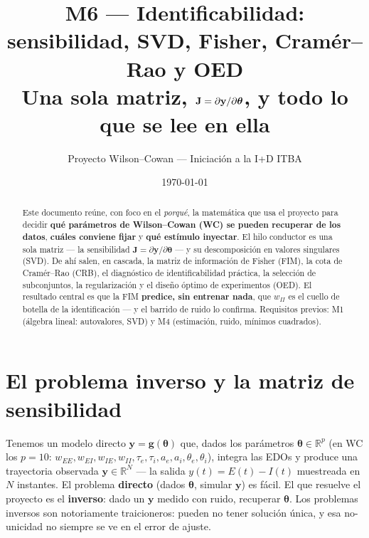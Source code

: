 \documentclass[11pt,a4paper]{article}
\title{\textbf{M6 --- Identificabilidad: sensibilidad, SVD, Fisher, Cramér--Rao y OED}\\[2pt]
\large Una sola matriz, $\J=\partial\mathbf{y}/\partial\thetavec$, y todo lo que se lee en ella}
\author{Proyecto Wilson--Cowan --- Iniciación a la I+D ITBA}
\date{\today}
\newcommand{\R}{\mathbb{R}}
\newcommand{\thetavec}{\bm{\theta}}
\newcommand{\J}{\mathbf{J}}
\begin{document}
\maketitle
\tableofcontents
\bigskip

\begin{abstract}
\noindent Este documento reúne, con foco en el \emph{porqué}, la matemática que usa el proyecto para decidir \textbf{qué parámetros de Wilson--Cowan (WC) se pueden recuperar de los datos}, \textbf{cuáles conviene fijar} y \textbf{qué estímulo inyectar}. El hilo conductor es una sola matriz --- la sensibilidad $\J=\partial\mathbf{y}/\partial\thetavec$ --- y su descomposición en valores singulares (SVD). De ahí salen, en cascada, la matriz de información de Fisher (FIM), la cota de Cramér--Rao (CRB), el diagnóstico de identificabilidad práctica, la selección de subconjuntos, la regularización y el diseño óptimo de experimentos (OED). El resultado central es que la FIM \textbf{predice, sin entrenar nada}, que $w_{II}$ es el cuello de botella de la identificación --- y el barrido de ruido lo confirma. Requisitos previos: M1 (álgebra lineal: autovalores, SVD) y M4 (estimación, ruido, mínimos cuadrados).
\end{abstract}

\section{El problema inverso y la matriz de sensibilidad}
\label{sec:sensibilidad}

Tenemos un modelo directo $\mathbf{y}=\mathbf{g}(\thetavec)$ que, dados los parámetros $\thetavec\in\R^{p}$ (en WC los $p=10$: $w_{EE},w_{EI},w_{IE},w_{II},\tau_e,\tau_i,a_e,a_i,\theta_e,\theta_i$), integra las EDOs y produce una trayectoria observada $\mathbf{y}\in\R^{N}$ --- la salida $y(t)=E(t)-I(t)$ muestreada en $N$ instantes. El problema \textbf{directo} (dados $\thetavec$, simular $\mathbf{y}$) es fácil. El que resuelve el proyecto es el \textbf{inverso}: dado un $\mathbf{y}$ medido con ruido, recuperar $\thetavec$. Los problemas inversos son notoriamente traicioneros: pueden no tener solución única, y esa no-unicidad no siempre se ve en el error de ajuste.
\end{document}
